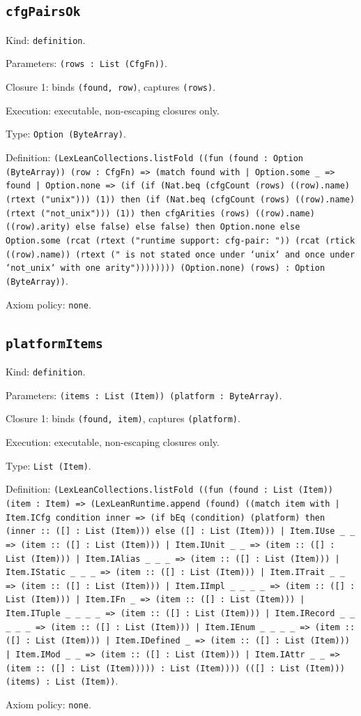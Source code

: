 \documentclass[11pt]{article}
\begin{document}
\subsection*{\texttt{cfgPairsOk}}
\noindent Kind: \texttt{definition}.\par
\noindent Parameters: \texttt{(rows : List (CfgFn))}.\par
\noindent Closure 1: binds \texttt{(found, row)}, captures \texttt{(rows)}.\par
\noindent Execution: executable, non-escaping closures only.\par
\noindent Type: \texttt{Option (ByteArray)}.\par
\noindent Definition: \texttt{(LexLeanCollections.listFold ((fun (found : Option (ByteArray)) (row : CfgFn) => (match found with | Option.some \_ => found | Option.none => (if (if (Nat.beq (cfgCount (rows) ((row).name) (rtext ("unix"))) (1)) then (if (Nat.beq (cfgCount (rows) ((row).name) (rtext ("not\_unix"))) (1)) then cfgArities (rows) ((row).name) ((row).arity) else false) else false) then Option.none else Option.some (rcat (rtext ("runtime support: cfg-pair: ")) (rcat (rtick ((row).name)) (rtext (" is not stated once under `unix` and once under `not\_unix` with one arity")))))))) (Option.none) (rows) : Option (ByteArray))}.\par
\noindent Axiom policy: \texttt{none}.\par
\subsection*{\texttt{platformItems}}
\noindent Kind: \texttt{definition}.\par
\noindent Parameters: \texttt{(items : List (Item)) (platform : ByteArray)}.\par
\noindent Closure 1: binds \texttt{(found, item)}, captures \texttt{(platform)}.\par
\noindent Execution: executable, non-escaping closures only.\par
\noindent Type: \texttt{List (Item)}.\par
\noindent Definition: \texttt{(LexLeanCollections.listFold ((fun (found : List (Item)) (item : Item) => (LexLeanRuntime.append (found) ((match item with | Item.ICfg condition inner => (if bEq (condition) (platform) then (inner :: ([] : List (Item))) else ([] : List (Item))) | Item.IUse \_ \_ => (item :: ([] : List (Item))) | Item.IUnit \_ \_ => (item :: ([] : List (Item))) | Item.IAlias \_ \_ \_ => (item :: ([] : List (Item))) | Item.IStatic \_ \_ \_ => (item :: ([] : List (Item))) | Item.ITrait \_ \_ => (item :: ([] : List (Item))) | Item.IImpl \_ \_ \_ \_ => (item :: ([] : List (Item))) | Item.IFn \_ => (item :: ([] : List (Item))) | Item.ITuple \_ \_ \_ \_ => (item :: ([] : List (Item))) | Item.IRecord \_ \_ \_ \_ \_ => (item :: ([] : List (Item))) | Item.IEnum \_ \_ \_ \_ => (item :: ([] : List (Item))) | Item.IDefined \_ => (item :: ([] : List (Item))) | Item.IMod \_ \_ => (item :: ([] : List (Item))) | Item.IAttr \_ \_ => (item :: ([] : List (Item))))) : List (Item)))) (([] : List (Item))) (items) : List (Item))}.\par
\noindent Axiom policy: \texttt{none}.\par
\end{document}
